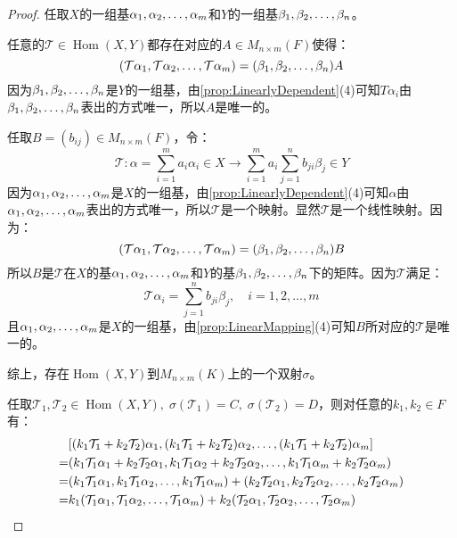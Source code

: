 \begin{proof}
	任取$X$的一组基$\alpha_1, \alpha_2, \dots, \alpha_{m}$和$Y$的一组基$\beta_1, \beta_2, \dots, \beta_{n}$。\par
	任意的$\mathcal{T}\in\operatorname{Hom}(X,Y)$都存在对应的$A\in M_{n\times m}(F)$使得：
	\begin{equation*}
		(\mathcal{T}\alpha_1, \mathcal{T}\alpha_2, \dots, \mathcal{T}\alpha_{m})=(\beta_1, \beta_2, \dots, \beta_{n})A
	\end{equation*}
	因为$\beta_1, \beta_2, \dots, \beta_{n}$是$Y$的一组基，由\cref{prop:LinearlyDependent}(4)可知$T\alpha_i$由$\beta_1, \beta_2, \dots, \beta_{n}$表出的方式唯一，所以$A$是唯一的。\par
	任取$B=(b_{ij})\in M_{n\times m}(F)$，令：
	\begin{equation*}
		\mathcal{T}:\alpha=\sum_{i=1}^{m}a_i\alpha_i\in X\longrightarrow\sum_{i=1}^{m}a_i\sum_{j=1}^{n}b_{ji}\beta_j\in Y
	\end{equation*}
	因为$\alpha_1, \alpha_2, \dots, \alpha_{m}$是$X$的一组基，由\cref{prop:LinearlyDependent}(4)可知$\alpha$由$\alpha_1, \alpha_2, \dots, \alpha_{m}$表出的方式唯一，所以$\mathcal{T}$是一个映射。显然$\mathcal{T}$是一个线性映射。因为：
	\begin{equation*}
		(\mathcal{T}\alpha_1, \mathcal{T}\alpha_2, \dots, \mathcal{T}\alpha_{m})=(\beta_1, \beta_2, \dots, \beta_{n})B
	\end{equation*}
	所以$B$是$\mathcal{T}$在$X$的基$\alpha_1, \alpha_2, \dots, \alpha_{m}$和$Y$的基$\beta_1, \beta_2, \dots, \beta_{n}$下的矩阵。因为$\mathcal{T}$满足：
	\begin{equation*}
		\mathcal{T}\alpha_i=\sum_{j=1}^{n}b_{ji}\beta_j,\quad i=1,2,\dots,m
	\end{equation*}
	且$\alpha_1, \alpha_2, \dots, \alpha_{m}$是$X$的一组基，由\cref{prop:LinearMapping}(4)可知$B$所对应的$\mathcal{T}$是唯一的。\par
	综上，存在$\operatorname{Hom}(X,Y)$到$M_{n\times m}(K)$上的一个双射$\sigma$。\par
	任取$\mathcal{T}_1,\mathcal{T}_2\in\operatorname{Hom}(X,Y),\;\sigma(\mathcal{T}_1)=C,\;\sigma(\mathcal{T}_2)=D$，则对任意的$k_1,k_2\in F$有：
	\begin{align*}
		&[\seq{(k_1\mathcal{T}_1+k_2\mathcal{T}_2)\alpha}{m}] \\
		=&(k_1\mathcal{T}_1\alpha_1+k_2\mathcal{T}_2\alpha_1,k_1\mathcal{T}_1\alpha_2+k_2\mathcal{T}_2\alpha_2,\dots,k_1\mathcal{T}_1\alpha_m+k_2\mathcal{T}_2\alpha_m) \\
		=&(k_1\mathcal{T}_1\alpha_1,k_1\mathcal{T}_1\alpha_2,\dots,k_1\mathcal{T}_1\alpha_m)+(k_2\mathcal{T}_2\alpha_1,k_2\mathcal{T}_2\alpha_2,\dots,k_2\mathcal{T}_2\alpha_m) \\
		=&k_1(\mathcal{T}_1\alpha_1,\mathcal{T}_1\alpha_2,\dots,\mathcal{T}_1\alpha_m)+k_2(\mathcal{T}_2\alpha_1,\mathcal{T}_2\alpha_2,\dots,\mathcal{T}_2\alpha_m) \\

\end{align*}
\end{proof}
